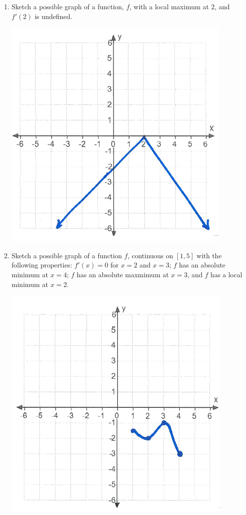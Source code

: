 \documentclass[nooutcomes]{ximera}
\begin{document}
\begin{problem}
\begin{enumerate}
\begin{freeResponse}
\begin{image}
	\end{image}	
	\end{freeResponse}	
	\item Sketch a possible graph of a function, $f$, with a local maximum at $2$, and $f'(2)$ is undefined.
	\begin{freeResponse} \hfil
	\begin{image}
	\includegraphics[scale=.4]{Figure4.png}
	\end{image}	
	\end{freeResponse}	
	 \item Sketch a possible graph of a function $f$, continuous on $[1,5]$ with the following properties: $f'(x)=0$ for $x=2$ and $x=3$; $f$ has an absolute minimum at $x=4$; $f$ has an absolute maxmimum at $x=3$, and $f$ has a local minimum at $x=2$.
		\begin{freeResponse} \hfil
	\begin{image}
	\includegraphics[scale=.5]{Figure7.png}
	\end{image}	
	\end{freeResponse} 
	 

\end{enumerate}
\end{problem}
\end{document}
